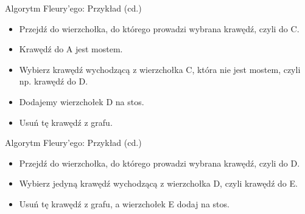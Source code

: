 \documentclass[polish,envcountsect,10pt]{beamer}
\begin{document}
\begin{frame}{Algorytm Fleury'ego: Przykład (cd.)}
    \begin{itemize}
      \item Przejdź do wierzchołka, do którego prowadzi wybrana krawędź, czyli do C.
      \item Krawędź do A jest mostem.
      \item Wybierz krawędź wychodzącą z wierzchołka C, która nie jest mostem, czyli np. krawędź do D.
      \item Dodajemy wierzchołek D na stos.
      \item Usuń tę krawędź z grafu.
    \end{itemize}
    \begin{center}
    \end{center}

\end{frame}

\begin{frame}{Algorytm Fleury'ego: Przykład (cd.)}
    \begin{itemize}
          \item Przejdź do wierzchołka, do którego prowadzi wybrana krawędź, czyli do D.
        \item Wybierz jedyną krawędź wychodzącą z wierzchołka D, czyli krawędź do E.
        \item Usuń tę krawędź z grafu, a wierzchołek E dodaj na stos.
    \end{itemize}
    \begin{center}
    \end{center}
\end{frame}
\end{document}
